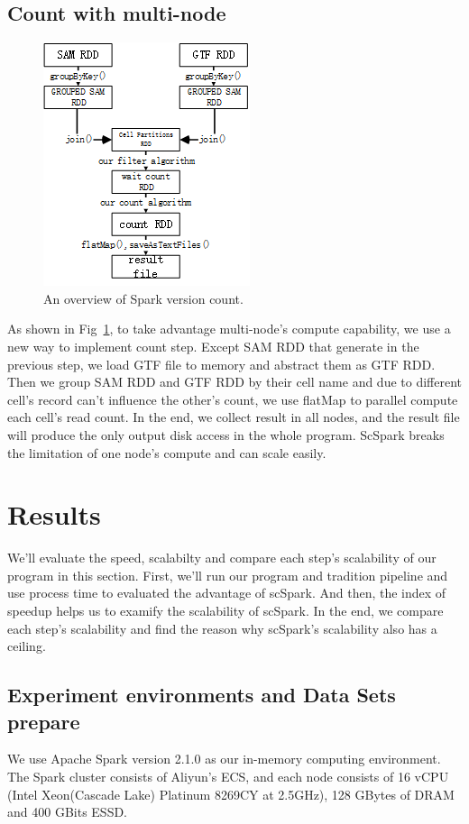 \documentclass[runningheads]{llncs}
\begin{document}
\subsection{Count with multi-node}
\begin{figure}
  \centering
  \includegraphics{fig3.png}
  \caption{An overview of Spark version count.} \label{fig3}
\end{figure}
As shown in Fig~\ref{fig3}, to take advantage multi-node's compute capability, we use a new way to implement count step.
Except SAM RDD that generate in the previous step, we load GTF file to memory and abstract them as GTF RDD.
Then we group SAM RDD and GTF RDD by their cell name and due to different cell's record can't influence the other's count, we use flatMap to parallel compute each cell's read count.
In the end, we collect result in all nodes, and the result file will produce the only output disk access in the whole program.
ScSpark breaks the limitation of one node's compute and can scale easily.

\section{Results}
We'll evaluate the speed, scalabilty and compare each step's scalability of our program in this section.
First, we'll run our program and tradition pipeline and use process time to evaluated the advantage of scSpark.
And then, the index of speedup helps us to examify the scalability of scSpark.
In the end, we compare each step's scalability and find the reason why scSpark's scalability also has a ceiling.
\subsection{Experiment environments and Data Sets prepare}
We use Apache Spark version 2.1.0 as our in-memory computing environment.
The Spark cluster consists of Aliyun's ECS, and each node consists of 16 vCPU
(Intel Xeon(Cascade Lake) Platinum 8269CY at 2.5GHz), 128 GBytes of DRAM and 400 GBits ESSD.
\end{document}
